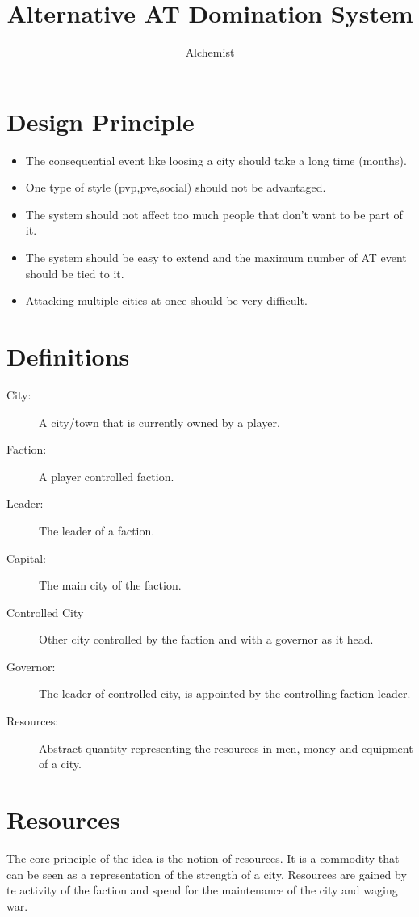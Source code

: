 \documentclass{article}
\author{Alchemist}
\title{Alternative AT Domination System}
\begin{document}
\maketitle

\section{Design Principle}
\begin{itemize}
	\item The consequential event like loosing a city should take a long time (months).
	\item One type of style (pvp,pve,social) should not be advantaged.
	\item The system should not affect too much people that don't want to be part of it.
	\item The system should be easy to extend and the maximum number of AT event should be tied to it.
	\item Attacking multiple cities at once should be very difficult.
\end{itemize}

\section{Definitions}
\begin{description}
	\item[City:] A city/town that is currently owned by a player.
	\item[Faction:] A player controlled faction.
	\item[Leader:] The leader of a faction.
	\item[Capital:] The main city of the faction.
	\item[Controlled City] Other city controlled by the faction and with a governor as it head.
	\item[Governor:] The leader of controlled city, is appointed by the controlling faction leader.
	\item[Resources:] Abstract quantity representing the resources in men, money and equipment of a city.
\end{description}

\section{Resources}
The core principle of the idea is the notion of resources. It is a commodity that can be seen as a representation of the strength of a city. Resources are gained by te activity of the faction and spend for the maintenance of the city and waging war.
\end{document}
